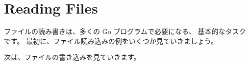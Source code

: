 \section{Reading Files}

ファイルの読み書きは、多くの Go プログラムで必要になる、 基本的なタスクです。 最初に、ファイル読み込みの例をいくつか見ていきましょう。




次は、ファイルの書き込みを見ていきます。